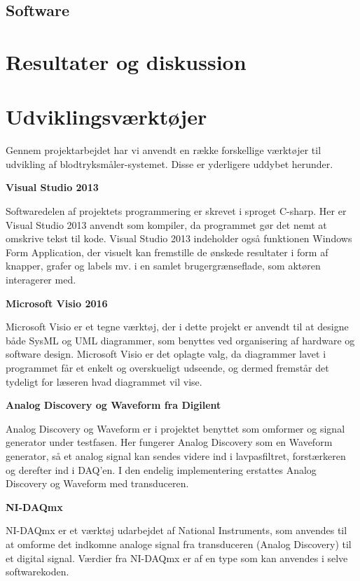 \subsection{Software}

\section{Resultater og diskussion}
\section{Udviklingsværktøjer}
Gennem projektarbejdet har vi anvendt en række forskellige værktøjer til udvikling af blodtryksmåler-systemet. Disse er yderligere uddybet herunder.

\textbf{Visual Studio 2013}

Softwaredelen af projektets programmering er skrevet i sproget C-sharp. Her er Visual Studio 2013 anvendt som kompiler, da programmet gør det nemt at omskrive tekst til kode. Visual Studio 2013 indeholder også funktionen Windows Form Application, der visuelt kan fremstille de ønskede resultater i form af knapper, grafer og labels mv. i en samlet brugergrænseflade, som aktøren interagerer med. 

\textbf{Microsoft Visio 2016}

Microsoft Visio er et tegne værktøj, der i dette projekt er anvendt til at designe både SysML og UML diagrammer, som benyttes ved organisering af hardware og software design. Microsoft Visio er det oplagte valg, da diagrammer lavet i programmet får et enkelt og overskueligt udseende, og dermed fremstår det tydeligt for læseren hvad diagrammet vil vise.

\textbf{Analog Discovery og Waveform fra Digilent}

Analog Discovery og Waveform er i projektet benyttet som omformer og signal generator under testfasen. Her fungerer Analog Discovery som en Waveform generator, så et analog signal kan sendes videre ind i lavpasfiltret, forstærkeren og derefter ind i DAQ’en. I den endelig implementering erstattes Analog Discovery og Waveform med transduceren. 

\textbf{NI-DAQmx}

NI-DAQmx er et værktøj udarbejdet af National Instruments, som anvendes til at omforme det indkomne analoge signal fra transduceren (Analog Discovery) til et digital signal. Værdier fra NI-DAQmx er af en type som kan anvendes i selve softwarekoden. 

